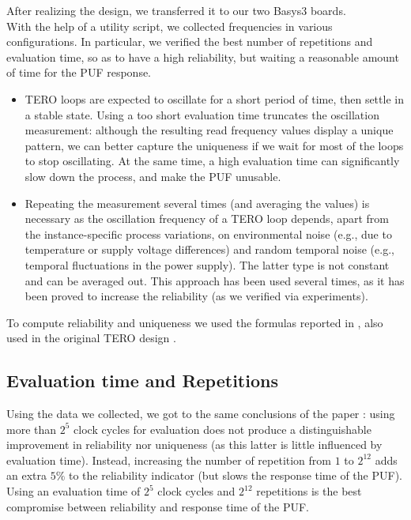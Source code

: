 After realizing the design, we transferred it to our two Basys3 boards. \\
With the help of a utility script, we collected frequencies in various configurations. 
In particular, we verified the best number of repetitions and evaluation time, so as to have 
a high reliability, but waiting a reasonable amount of time for the PUF response. \\

\begin{itemize}
    \item TERO loops are expected to oscillate for a short period of time, then settle in a stable state.
    Using a too short evaluation time truncates the oscillation measurement: although the resulting read
    frequency values display a unique pattern, we can better capture the uniqueness  
    if we wait for most of the loops to stop oscillating. At the same time, a high evaluation time
    can significantly slow down the process, and make the PUF unusable.
    \item Repeating the measurement several times (and averaging the values) is necessary as the
    oscillation frequency of a TERO loop depends, apart from the instance-specific process variations, on environmental
    noise (e.g., due to temperature or supply voltage differences) and random temporal noise 
    (e.g., temporal fluctuations in the power supply). The latter type is not constant and can be
    averaged out. This approach has been used several times, as it has been proved to increase the reliability
    (as we verified via experiments).
\end{itemize}  

\vspace{10pt}
To compute reliability and uniqueness we used the formulas reported in \cite{Journal}, also used in the
original TERO design \cite{tero_original}.

\subsection{Evaluation time and Repetitions}
\label{subsec:eval_and_repetitions}

Using the data we collected, we got to the same conclusions of the paper \cite{ref_pap}: using more than $ 2^5 $
clock cycles for evaluation does not produce a distinguishable improvement in reliability nor uniqueness 
(as this latter is little influenced by evaluation time). Instead, increasing the number of repetition
from $ 1 $ to $ 2^{12} $ adds an extra $ 5\% $ to the reliability indicator (but slows the response time of the PUF). \\
Using an evaluation time of $ 2^5 $ clock cycles and $ 2^{12} $ repetitions
is the best compromise between reliability and response time of the PUF. \\

